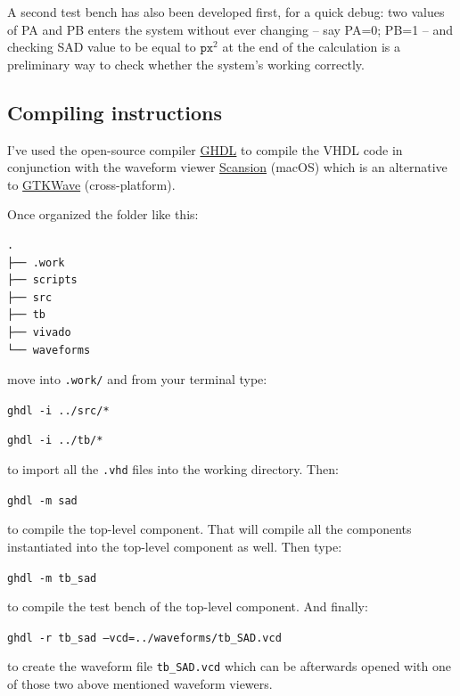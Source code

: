\documentclass[12pt, a4paper]{article}
\begin{document}
A second test bench has also been developed first, for a quick debug: two values of PA and PB enters the system without ever changing -- say PA=0; PB=1 -- and checking SAD value to be equal to $\texttt{px}^2$ at the end of the calculation is a preliminary way to check whether the system's working correctly.




\subsection{Compiling instructions}

I've used the open-source compiler \href{http://ghdl.free.fr/}{GHDL} to compile the VHDL code in conjunction with the waveform viewer \href{http://www.logicpoet.com/scansion/}{Scansion} (macOS) which is an alternative to \href{http://gtkwave.sourceforge.net/}{GTKWave} (cross-platform).
\newline

Once organized the folder like this:

\begin{verbatim}
.
├── .work
├── scripts
├── src
├── tb
├── vivado
└── waveforms
\end{verbatim}

move into \texttt{.work/} and from your terminal type:
\newline

\texttt{ghdl -i ../src/*}

\texttt{ghdl -i ../tb/*}
\newline

to import all the \texttt{.vhd} files into the working directory. Then:
\newline

\texttt{ghdl -m sad}
\newline

to compile the top-level component. That will compile all the components 
instantiated into the top-level component as well. Then type:
\newline

\texttt{ghdl -m tb\_sad}
\newline

to compile the test bench of the top-level component. And finally:
\newline

\texttt{ghdl -r tb\_sad --vcd=../waveforms/tb\_SAD.vcd}
\newline

to create the waveform file \texttt{tb\_SAD.vcd} which can be afterwards opened with one of those two above mentioned waveform viewers.
\end{document}

